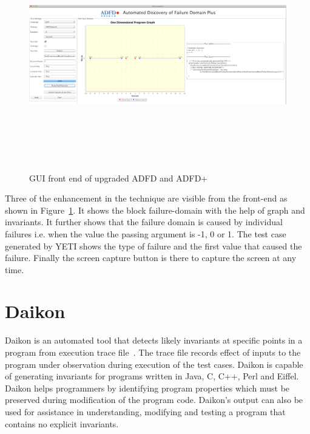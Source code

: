 \bigskip
\begin{figure}[ht]
\centering
\includegraphics[width= 15.5cm,height=10cm]{chapter7/adfdUpgraded.png}
\bigskip
\caption{GUI front end of upgraded ADFD and ADFD+}
\label{fig:adfdUpgraded}
\end{figure}
\bigskip

Three of the enhancement in the technique are visible from the front-end as shown in Figure~\ref{fig:adfdUpgraded}. It shows the block failure-domain with the help of graph and invariants. It further shows that the failure domain is caused by individual failures i.e. when the value the passing argument is -1, 0 or 1. The test case generated by YETI shows the type of failure and the first value that caused the failure. Finally the screen capture button is there to capture the screen at any time.


\section{Daikon}
Daikon is an automated tool that detects likely invariants at specific points in a program from execution trace file~\cite{ernst2007daikon}. The trace file records effect of inputs to the program under observation during execution of the test cases. Daikon is capable of generating invariants for programs written in Java, C, C++, Perl and Eiffel. Daikon helps programmers by identifying program properties which must be preserved during modification of the program code. Daikon's output can also be used for assistance in understanding, modifying and testing a program that contains no explicit invariants.


